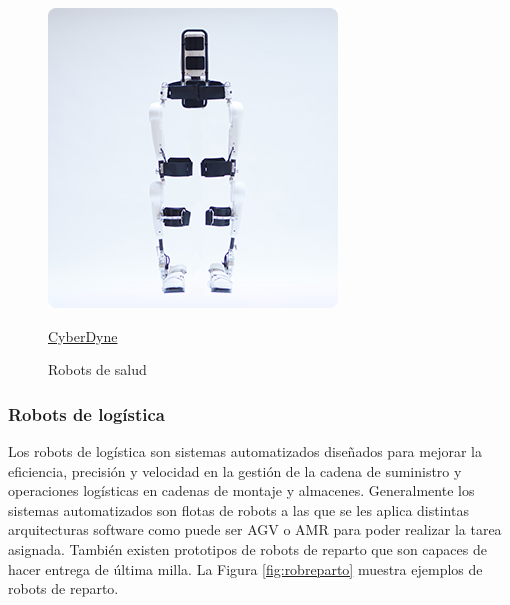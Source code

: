 \begin{figure}[ht!]
\begin{minipage}{0.25\linewidth}
    	\includegraphics[width=\linewidth]{figs/cyberdyne.jpg}
    	\caption*{\centering\href{https://www.cyberdyne.com/}{CyberDyne}}
    \end{minipage}
	\caption{Robots de salud}
	\label{fig:robsalud}
\end{figure}

\subsubsection{Robots de logística}

Los robots de logística son sistemas automatizados diseñados para mejorar la eficiencia, precisión y velocidad en la gestión de la cadena de suministro y operaciones logísticas en cadenas de montaje y almacenes. Generalmente los sistemas automatizados son flotas de robots a las que se les aplica distintas arquitecturas software como puede ser \acs{AGV} o \acs{AMR} para poder realizar la tarea asignada. También existen prototipos de robots de reparto que son capaces de hacer entrega de última milla. La Figura \ref{fig:robreparto}  muestra ejemplos de robots de reparto. \\ 

